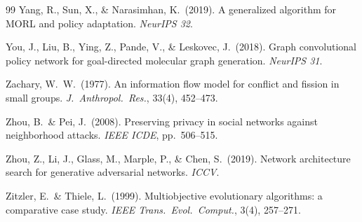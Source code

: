 \documentclass[10pt,twocolumn,letterpaper]{article}
\begin{document}
\begin{thebibliography}{99}
Yang, R., Sun, X., \& Narasimhan, K.\ (2019).
A generalized algorithm for MORL and policy adaptation.
\emph{NeurIPS 32}.

You, J., Liu, B., Ying, Z., Pande, V., \& Leskovec, J.\ (2018).
Graph convolutional policy network for goal-directed molecular graph generation.
\emph{NeurIPS 31}.

Zachary, W.~W.\ (1977).
An information flow model for conflict and fission in small groups.
\emph{J.\ Anthropol.\ Res.}, 33(4), 452--473.

Zhou, B.\ \& Pei, J.\ (2008).
Preserving privacy in social networks against neighborhood attacks.
\emph{IEEE ICDE}, pp.\ 506--515.

Zhou, Z., Li, J., Glass, M., Marple, P., \& Chen, S.\ (2019).
Network architecture search for generative adversarial networks.
\emph{ICCV}.

Zitzler, E.\ \& Thiele, L.\ (1999).
Multiobjective evolutionary algorithms: a comparative case study.
\emph{IEEE Trans.\ Evol.\ Comput.}, 3(4), 257--271.

\end{thebibliography}
\end{document}
